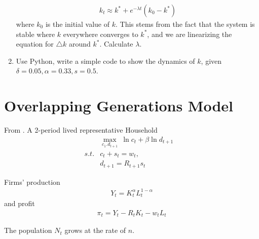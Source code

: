 \documentclass[10pt,a4paper]{book}
\theoremstyle{definition}\newtheorem{definition}{Definition}
\theoremstyle{definition}\newtheorem{fact}{Fact}
\theoremstyle{definition}\newtheorem{ex}{Ex.}
\theoremstyle{definition}\newtheorem{project}{Project}
\theoremstyle{definition}\newtheorem{problem}{Problem}
\theoremstyle{definition}\newtheorem{example}{Example}
\numberwithin{theorem}{chapter}
\numberwithin{corollary}{chapter}
\numberwithin{assumption}{chapter}
\numberwithin{definition}{chapter}
\numberwithin{prop}{chapter}
\numberwithin{notation}{chapter}
\numberwithin{problem}{chapter}
\numberwithin{example}{chapter}
\numberwithin{fact}{chapter}
\numberwithin{ex}{chapter}
\begin{document}
\begin{enumerate}
		\begin{align*}
			k_t \approx k^* + e^{-\lambda t} (k_0 - k^*)
		\end{align*}
		where $k_0$ is the initial value of $k$. This stems from the fact that the system is stable where $k$ everywhere converges to $k^*$, and we are linearizing the equation for $\triangle k$ around $k^*$. Calculate $\lambda$.
		\item Use Python, write a simple code to show the dynamics of $k$, given $\delta=0.05, \alpha=0.33, s=0.5$.
	\end{enumerate}
	
	\section{Overlapping Generations Model}
	From \citet{de2002theory}. A 2-period lived representative Household
	\begin{align*}
		& \max_{c_1. d_{t+1}} \ \ln c_t + \beta \ln d_{t+1} \\
		s.t. & c_t + s_t = w_t, &                                                   \\
		& d_{t+1} = R_{t+1} s_t                             
	\end{align*}
	
	Firms' production
	\begin{align*}
		Y_t = K_t^\alpha L_t^{1-\alpha} 
	\end{align*}
	and profit
	\begin{align*}
		\pi_t = Y_t - R_t K_t - w_t L_t 
	\end{align*}
	
	The population $N_t$ grows at the rate of $n$.
	
\end{document}
